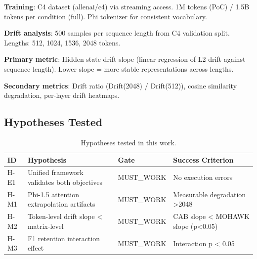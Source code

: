 \textbf{Training}: C4 dataset (allenai/c4) via streaming access. 1M tokens (PoC) / 1.5B tokens per condition (full). Phi tokenizer for consistent vocabulary.

\textbf{Drift analysis}: 500 samples per sequence length from C4 validation split. Lengths: 512, 1024, 1536, 2048 tokens.

\textbf{Primary metric}: Hidden state drift slope (linear regression of L2 drift against sequence length). Lower slope = more stable representations across lengths.

\textbf{Secondary metrics}: Drift ratio (Drift(2048) / Drift(512)), cosine similarity degradation, per-layer drift heatmaps.

\subsection{Hypotheses Tested}

\begin{table}[h]
\centering
\begin{tabular}{llll}
\toprule
\textbf{ID} & \textbf{Hypothesis} & \textbf{Gate} & \textbf{Success Criterion} \\
\midrule
H-E1 & Unified framework validates both objectives & MUST\_WORK & No execution errors \\
H-M1 & Phi-1.5 attention extrapolation artifacts & MUST\_WORK & Measurable degradation >2048 \\
H-M2 & Token-level drift slope < matrix-level & MUST\_WORK & CAB slope < MOHAWK slope (p<0.05) \\
H-M3 & F1 retention interaction effect & MUST\_WORK & Interaction p < 0.05 \\
\bottomrule
\end{tabular}
\caption{Hypotheses tested in this work.}
\label{tab:hypotheses}
\end{table}
